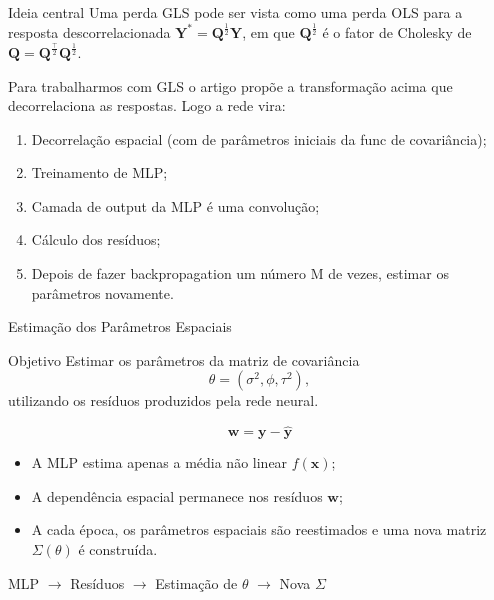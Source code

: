 \documentclass{beamer}
\begin{document}
\begin{frame}
    \begin{block}{Ideia central}
        Uma perda GLS pode ser vista como uma perda OLS para a resposta descorrelacionada $\boldsymbol{Y}^* = \mathbf{Q}^{\frac{1}{2}}\boldsymbol{Y}$, 
        em que $\mathbf{Q}^{\frac{1}{2}}$ é o fator de Cholesky de $\mathbf{Q} = \mathbf{Q}^{\frac{\top}{2}}\mathbf{Q}^{\frac{1}{2}}$.
    \end{block}
    \vspace{0.2cm}

    Para trabalharmos com GLS o artigo propõe a transformação acima que decorrelaciona as respostas. Logo a rede vira:
    \vspace{0.2cm}

    \begin{enumerate}
        \item Decorrelação espacial (com de parâmetros iniciais da func de covariância);
        \item Treinamento de MLP;
        \item Camada de output da MLP é uma convolução;
        \item Cálculo dos resíduos;
        \item Depois de fazer backpropagation um número M de vezes, estimar os parâmetros novamente. 
    \end{enumerate}
\end{frame}


\begin{frame}{Estimação dos Parâmetros Espaciais}

\begin{block}{Objetivo}
Estimar os parâmetros da matriz de covariância
\[
\theta=(\sigma^2,\phi,\tau^2),
\]
utilizando os resíduos produzidos pela rede neural.
\end{block}

\[
\mathbf{w}=\mathbf{y}-\hat{\mathbf{y}}
\]

\begin{itemize}
    \item A MLP estima apenas a média não linear $f(\mathbf{x})$;
    \item A dependência espacial permanece nos resíduos $\mathbf{w}$;
    \item A cada época, os parâmetros espaciais são reestimados e uma nova matriz $\Sigma(\theta)$ é construída.
\end{itemize}

\begin{center}
MLP $\rightarrow$ Resíduos $\rightarrow$ Estimação de $\theta$ $\rightarrow$ Nova $\Sigma$
\end{center}

\end{frame}
\end{document}
